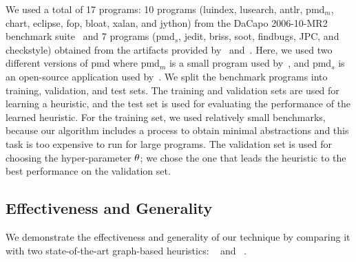 We used a total of 17 programs: 10 programs (luindex, lusearch, antlr, pmd$_{m}$, chart, eclipse, fop, bloat, xalan, and jython) from the DaCapo 2006-10-MR2 benchmark suite~\cite{Blackburn2006}
and 7 programs (pmd$_{s}$, jedit, briss, soot, findbugs, JPC, and checkstyle) obtained from the artifacts provided by~\cite{Tan2017} and~\cite{Li2018b}.
Here, we used two different versions of pmd where pmd$_{m}$ is a small program used by~\cite{Tan2017}, and pmd$_{s}$ is an open-source application used by~\cite{Li2018b}.
We split the benchmark programs into training, validation, and test sets.
The training and validation sets are used for learning a heuristic, and the test set is used for evaluating the performance of the learned heuristic.
For the training set, we used relatively small benchmarks, because our algorithm includes a process
to obtain minimal abstractions and this task is too expensive to run for large programs.
The validation set is used for choosing the hyper-parameter ${\theta}$; we chose the one that leads the heuristic to the best performance on the validation set.


\subsection{Effectiveness and Generality}
We demonstrate the effectiveness and generality of our technique by comparing it with two state-of-the-art graph-based heuristics: \Scaler~\cite{Li2018b} and \Mahjong~\cite{Tan2017}.


